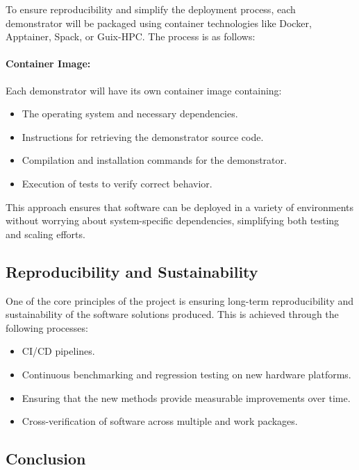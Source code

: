 To ensure reproducibility and simplify the deployment process, each demonstrator will be packaged using container technologies like Docker, Apptainer, Spack, or Guix-HPC. The process is as follows:

\paragraph{Container Image:}
Each demonstrator will have its own container image containing:
\begin{itemize}
    \item The operating system and necessary dependencies.
    \item Instructions for retrieving the demonstrator source code.
    \item Compilation and installation commands for the demonstrator.
    \item Execution of tests to verify correct behavior.
\end{itemize}

This approach ensures that software can be deployed in a variety of environments without worrying about system-specific dependencies, simplifying both testing and scaling efforts.

\subsection{Reproducibility and Sustainability}
\label{sec:reproducibility}

One of the core principles of the \exama project is ensuring long-term reproducibility and sustainability of the software solutions produced. This is achieved through the following processes:
\begin{itemize}
    \item CI/CD pipelines.
    \item Continuous benchmarking and regression testing on new hardware platforms.
    \item Ensuring that the new methods provide measurable improvements over time.
    \item Cross-verification of software across multiple \exama and \numpex work packages.
\end{itemize}

\subsection{Conclusion}
\label{sec:methodology-conclusion}

